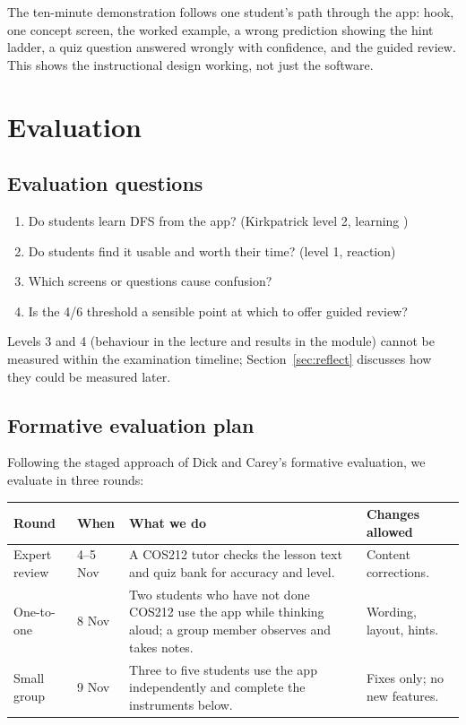 \documentclass[11pt,a4paper]{article}
\begin{document}
The ten-minute demonstration follows one student's path through the app: hook, one concept screen,
the worked example, a wrong prediction showing the hint ladder, a quiz question answered wrongly
with confidence, and the guided review. This shows the instructional design working, not just the
software.

\section{Evaluation}
\label{sec:eval}

\subsection{Evaluation questions}

\begin{enumerate}
  \item Do students learn DFS from the app? (Kirkpatrick level 2, learning \cite{kirkpatrick2006})
  \item Do students find it usable and worth their time? (level 1, reaction)
  \item Which screens or questions cause confusion?
  \item Is the 4/6 threshold a sensible point at which to offer guided review?
\end{enumerate}

Levels 3 and 4 (behaviour in the lecture and results in the module) cannot be measured within the
examination timeline; Section~\ref{sec:reflect} discusses how they could be measured later.

\subsection{Formative evaluation plan}

Following the staged approach of Dick and Carey's formative evaluation, we evaluate in three rounds:

\begin{longtable}{@{}p{2.6cm} p{2.4cm} p{6.0cm} p{3.6cm}@{}}
  \toprule
  \textbf{Round} & \textbf{When} & \textbf{What we do} & \textbf{Changes allowed} \\
  \midrule
  \endhead
  Expert review & 4--5 Nov & A COS212 tutor checks the lesson text and quiz bank for accuracy and
      level. & Content corrections. \\
  One-to-one & 8 Nov & Two students who have not done COS212 use the app while thinking aloud; a
      group member observes and takes notes. & Wording, layout, hints. \\
  Small group & 9 Nov & Three to five students use the app independently and complete the
      instruments below. & Fixes only; no new features. \\
  \bottomrule
\end{longtable}
\end{document}
